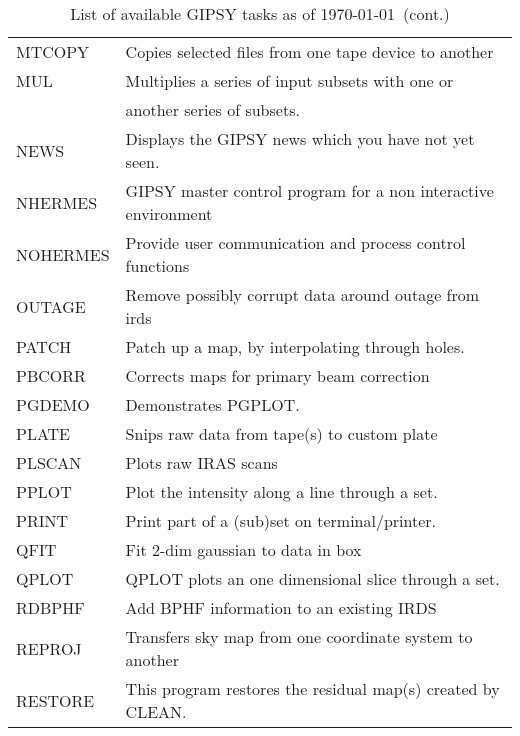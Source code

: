 \begin{table}
\begin{center}
\begin{tabular}{ | l | l | }
MTCOPY   & Copies selected files from one tape device to another\\
MUL      & Multiplies a series of input subsets with one or \\
         & another series of subsets.\\
NEWS     & Displays the GIPSY news which you have not yet seen.\\
NHERMES  & GIPSY master control program for a non interactive environment\\
NOHERMES & Provide user communication and process control functions\\
OUTAGE   & Remove possibly corrupt data around outage from irds\\
PATCH    & Patch up a map, by interpolating through holes.\\
PBCORR   & Corrects maps for primary beam correction\\
PGDEMO   & Demonstrates PGPLOT.\\
PLATE    & Snips raw data from tape(s) to custom plate\\
PLSCAN   & Plots raw IRAS scans\\
PPLOT    & Plot the intensity along a line through a set.\\
PRINT    & Print part of a (sub)set on terminal/printer.\\
QFIT     & Fit 2-dim gaussian to data in box\\
QPLOT    & QPLOT plots an one dimensional slice through a set.\\
RDBPHF   & Add BPHF information to an existing IRDS\\
REPROJ   & Transfers sky map from one coordinate system to another\\
RESTORE  & This program restores the residual map(s) created by CLEAN.\\
\hline
\end{tabular}
\caption{List of available GIPSY tasks as of \today\ (cont.)}
\end{center}
\end{table}

